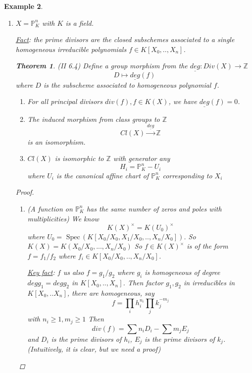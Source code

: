 \documentclass[11pt]{article}
\newtheorem{thm}{Theorem}[section]
\newtheorem{ex}[thm]{Example}
\newcommand{\spec}{\text{ Spec}\,}
\newcommand{\proj}{\mathbb P}
\newcommand{\intg}{\mathbb Z}
\newcommand{\ratl}{\mathbb Q}
\newcommand{\lrta}{\longrightarrow}
\begin{document}
\begin{ex}
\begin{enumerate}[label=(\arabic*)]
We sketch the reason here.
$$
H(L)=\{\text{fractional ideals}\}/\{\text{ principal ideals}\}
$$
where $\{\text{fractional ideals}\}\simeq\text{free Abelian group generated by prime ideals}$ and  a fractional ideal is principal iff it is associated to a principal ideal.

There are still many open questions: are there infinitely many $L/\ratl$ with $Cl(\spec A)=0$? (i.e. $A$ UFD)

How are $Cl(\spec A)$ distributed when $L/\ratl$ varies? (Cohen-Lenstra Heuristics)

\item $X=\proj^n_K$ with $K$ is a field.

\underline{Fact}: the prime divisors are the closed subschemes associated to a single homogeneous irreducible polynomials $f\in  K[X_0,..,X_n]$.
\begin{thm}
(II 6.4) Define a group morphism from the $\underline{deg}: Div(X)\lrta \intg$
$$
D\longmapsto \underline{deg}(f)
$$ 
where $D$ is the subscheme associated to homogeneous polynomial $f$.
\begin{enumerate}[label=(\alph*)]
\item For all principal divisors $div(f), f\in K(X)$, we have $\underline{deg}(f)=0$.
\item The induced morphism from class groups to $\intg$ 
$$
Cl(X)\overset{\underline{deg}}{\lrta }\intg
$$
is  an isomorphism.
\item $Cl(X)$ is isomorphic to $\intg$ with generator any 
$$
H_i=\proj^n_K-U_i
$$
where $U_i$ is  the canonical affine chart of $\proj^n_K$ corresponding to $X_i$
\end{enumerate}
\end{thm}
\begin{proof}
\begin{enumerate}[label=(\alph*)]
\item (A function on $\proj^n_K$ has the same number of zeros and poles with multiplicities) We know
$$
K(X)^\times=K(U_0)^\times
$$
where $U_0=\spec(K[X_0/X_0,X_1/X_0,..,X_n/X_0])$. So $K(X)=K(X_0/X_0,...,X_n/X_0)$
So $f\in K(X)^\times$ is of the form $f=f_1/f_2$ where $f_i \in K[X_0/X_0,..,X_n/X_0]$. 

\underline{Key fact}: 
$f$ us also $f=g_1/g_2$ where $g_i$ is homogeneous of degree $deg g_1=deg g_2$ in $K[X_0,..,X_n]$. Then factor $g_1,g_2$ in irreducibles in $K[X_0,..X_n]$, there are homogeneous, say 
$$
f=\prod_i h_i^{n_i}\prod_j k_j^{-m_j}
$$
with $n_i\geq 1, m_j \geq 1$
Then 
$$
div(f)=\sum n_i D_i-\sum m_j E_j
$$
and $D_i$ is the prime divisors of $h_i$, $E_j$ is the prime divisors of $k_j$. (Intuitively, it is clear, but we need a proof)


\end{enumerate}
\end{proof}
\end{enumerate}
\end{ex}
\end{document}
